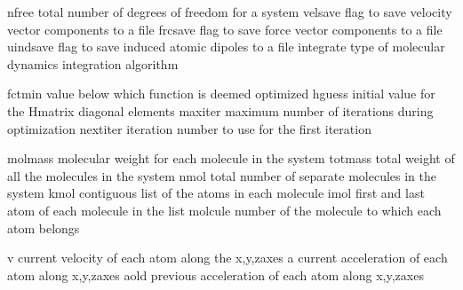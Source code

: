 \documentclass[letterpaper,11pt,english]{sphinxmanual}
\begin{document}

\begin{sphinxVerbatim}[commandchars=\\\{\}]
nfree           total number of degrees of freedom for a system
velsave         flag to save velocity vector components to a file
frcsave         flag to save force vector components to a file
uindsave        flag to save induced atomic dipoles to a file
integrate       type of molecular dynamics integration algorithm
\end{sphinxVerbatim}


\begin{sphinxVerbatim}[commandchars=\\\{\}]
fctmin          value below which function is deemed optimized
hguess          initial value for the H\PYGZhy{}matrix diagonal elements
maxiter         maximum number of iterations during optimization
nextiter        iteration number to use for the first iteration
\end{sphinxVerbatim}


\begin{sphinxVerbatim}[commandchars=\\\{\}]
molmass         molecular weight for each molecule in the system
totmass         total weight of all the molecules in the system
nmol            total number of separate molecules in the system
kmol            contiguous list of the atoms in each molecule
imol            first and last atom of each molecule in the list
molcule         number of the molecule to which each atom belongs
\end{sphinxVerbatim}


\begin{sphinxVerbatim}[commandchars=\\\{\}]
v               current velocity of each atom along the x,y,z\PYGZhy{}axes
a               current acceleration of each atom along x,y,z\PYGZhy{}axes
aold            previous acceleration of each atom along x,y,z\PYGZhy{}axes
\end{sphinxVerbatim}

\end{document}

